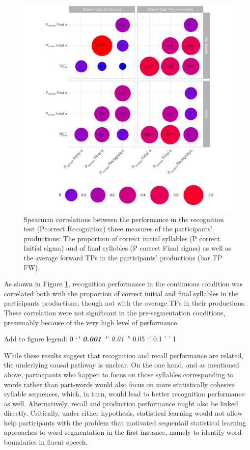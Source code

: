 \documentclass[
]{article}
\begin{document}
\begin{figure}

{\centering \includegraphics[width=0.8\linewidth]{segmentation_recall_combined_for_revision2_files/figure-latex/correlation-recognition-vs-position-plot-1} 

}

\caption{Spearman correlations between the performance in the recognition test (P{correct} Recognition) three measures of the participants' productions: The proportion of correct initial syllables (P {correct} Initial sigma) and of final syllables (P {correct} Final sigma) as well as the average forward TPs in the participants' productions (bar {TP {FW}}).}\label{fig:correlation-recognition-vs-position-plot}
\end{figure}

As shown in Figure \ref{fig:correlation-recognition-vs-position-plot},
recognition performance in the continuous condition was correlated both
with the proportion of correct initial and final syllables in the
participants productions, though not with the average TPs in their
productions. These correlation were not significant in the
pre-segmentation conditions, presumably because of the very high level
of performance.

Add to figure legend: 0 `\emph{\textbf{' 0.001 '}' 0.01 '}' 0.05 `.' 0.1
' ' 1

While these results suggest that recognition and recall performance are
related, the underlying causal pathway is unclear. On the one hand, and
as mentioned above, participants who happen to focus on those syllables
corresponding to words rather than part-words would also focus on more
statistically cohesive syllable sequences, which, in turn, would lead to
better recognition performance as well. Alternatively, recall and
production performance might also be linked directly. Critically, under
either hypothesis, statistical learning would not allow help
participants with the problem that motivated sequentail statistical
learning approaches to word segmentation in the first instance, namely
to identify word boundaries in fluent speech.
\end{document}
